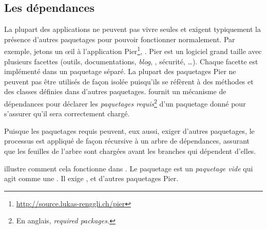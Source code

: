 \documentclass[a4paper,10pt,twoside]{book}
\begin{document}
\subsection{Les dépendances}%

La plupart des applications ne peuvent pas vivre seules et exigent
typiquement  la présence d'autres paquetages pour pouvoir
fonctionner normalement. Par exemple, jetons un \oe il
à l'application
Pier\footnote{\url{http://source.lukas-renggli.ch/pier}}, 
.
 Pier est un logiciel grand taille avec plusieurs facettes (outils,
 documentations, \emph{blog}, , sécurité, \ldots). Chaque facette est
 implémenté dans un paquetage séparé. La plupart des paquetages Pier
 ne peuvent pas être utilisés de façon isolée puisqu'ils se réfèrent à
 des méthodes et des classes définies dans d'autres paquetages. \MC{}
fournit un mécanisme de dépendances pour déclarer les \emph{paquetages
  requis}\footnote{En anglais, \emph{required packages.}} %
d'un paquetage donné pour s'assurer qu'il sera correctement chargé.

 Puisque les paquetages requis peuvent, eux aussi, exiger
d'autres paquetages, le processus est appliqué de façon récursive à un
arbre de dépendances, assurant que les feuilles de l'arbre sont
chargées avant les branches qui dépendent d'elles. 



 illustre comment cela fonctionne dans 
 .
Le paquetage  est un \emph{paquetage vide} qui agit comme
une . %
Il exige ,  et d'autres paquetages Pier.
\end{document}

